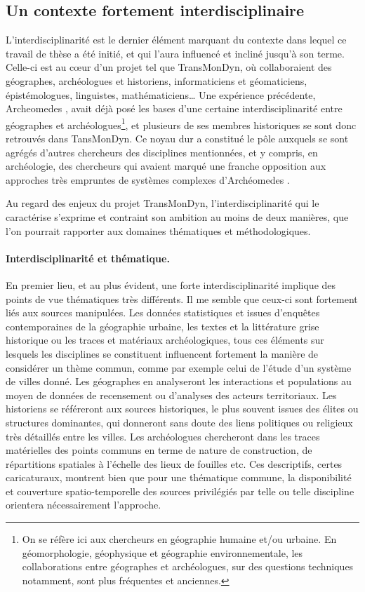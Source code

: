 \subsection{Un contexte fortement interdisciplinaire}

L'interdisciplinarité est le dernier élément marquant du contexte dans lequel ce travail de thèse a été initié, et qui l'aura influencé et incliné jusqu'à son terme.
Celle-ci est au cœur d'un projet tel que TransMonDyn, où collaboraient des géographes, archéologues et historiens, informaticiens et géomaticiens, épistémologues, linguistes, mathématiciens\ldots{}
Une expérience précédente, Archeomedes \autocite{durand1998archaeomedes}, avait déjà posé les bases d'une certaine interdisciplinarité entre géographes et archéologues\footnote{
	On se réfère ici aux chercheurs en géographie humaine et/ou urbaine.
	En géomorphologie, géophysique et géographie environnementale, les collaborations entre géographes et archéologues, sur des questions techniques notamment, sont plus fréquentes et anciennes.
}, et plusieurs de ses membres historiques se sont donc retrouvés dans TansMonDyn.
Ce \og noyau dur\fg{} a constitué le pôle auxquels se sont agrégés d'autres chercheurs des disciplines mentionnées, et y compris, en archéologie, des chercheurs qui avaient marqué une franche opposition aux approches très empruntes de systèmes complexes d'Archéomedes \autocite[voir][par exemple]{ferdiere_modelisation_2000}.

Au regard des enjeux du projet TransMonDyn, l'interdisciplinarité qui le caractérise s'exprime et contraint son ambition au moins de deux manières, que l'on pourrait rapporter aux domaines thématiques et méthodologiques.

\paragraph{Interdisciplinarité et thématique.} 
En premier lieu, et au plus évident, une forte interdisciplinarité implique des points de vue thématiques très différents.
Il me semble que ceux-ci sont fortement liés aux sources manipulées.
Les données statistiques et issues d'enquêtes contemporaines de la géographie urbaine, les textes et la littérature grise historique ou les traces et matériaux archéologiques, tous ces éléments sur lesquels les disciplines se constituent influencent fortement la manière de considérer un thème commun, comme par exemple celui de l'étude d'un système de villes donné.
Les géographes en analyseront les interactions et populations au moyen de données de recensement ou d'analyses des acteurs territoriaux.
Les historiens se référeront aux sources historiques, le plus souvent issues des élites ou structures dominantes, qui donneront sans doute des liens politiques ou religieux très détaillés entre les villes.
Les archéologues chercheront dans les traces matérielles des points communs en terme de nature de construction, de répartitions spatiales à l'échelle des lieux de fouilles etc.
Ces descriptifs, certes caricaturaux, montrent bien que pour une thématique commune, la disponibilité et couverture spatio-temporelle des sources privilégiés par telle ou telle discipline orientera nécessairement l'approche.

